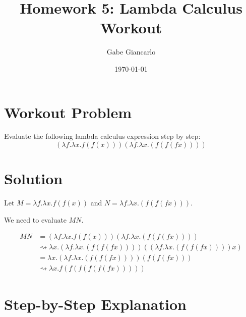 \documentclass[12pt]{article}
\title{Homework 5: Lambda Calculus Workout}
\author{Gabe Giancarlo}
\date{\today}
\begin{document}
\maketitle

\section{Workout Problem}

Evaluate the following lambda calculus expression step by step:
$$(\lambda f.\lambda x.f(f(x))) (\lambda f.\lambda x.(f(f(f x))))$$

\section{Solution}

Let $M = \lambda f.\lambda x.f(f(x))$ and $N = \lambda f.\lambda x.(f(f(f x)))$.

We need to evaluate $M N$.

\begin{align}
M N &= (\lambda f.\lambda x.f(f(x))) (\lambda f.\lambda x.(f(f(f x)))) \\
&\rightsquigarrow \lambda x. (\lambda f.\lambda x.(f(f(f x)))) ((\lambda f.\lambda x.(f(f(f x)))) x) \\
&= \lambda x. (\lambda f.\lambda x.(f(f(f x)))) (f(f(f x))) \\
&\rightsquigarrow \lambda x. f(f(f(f(f(f x)))))
\end{align}

\section{Step-by-Step Explanation}
\end{document}

